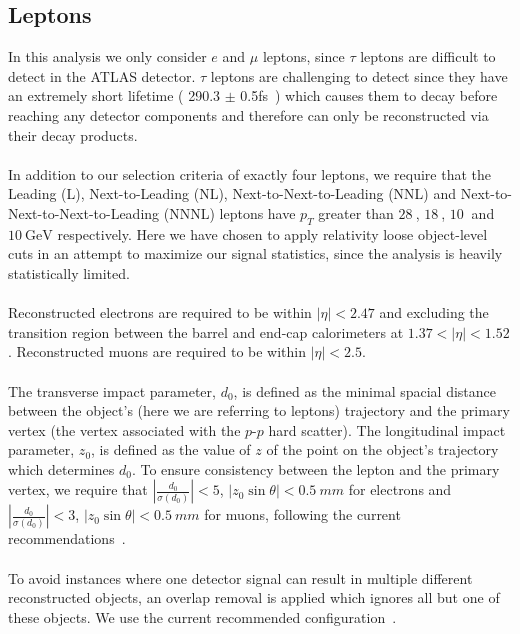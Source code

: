 \subsection{Leptons}
\label{sec:lepton-object}
In this analysis we only consider $e$ and $\mu$ leptons, since $\tau$ leptons are difficult to detect in the ATLAS detector. $\tau$ leptons are challenging to detect since they have an extremely short lifetime ( 290.3 $\pm$ 0.5fs~\cite{pdg}) which causes them to decay before reaching any detector components and therefore can only be reconstructed via their decay products.\\\\

In addition to our selection criteria of exactly four leptons, we require that the Leading (L), Next-to-Leading (NL), Next-to-Next-to-Leading (NNL) and Next-to-Next-to-Next-to-Leading (NNNL) leptons have $p_{T}$ greater than $\SI{28}{}$, $\SI{18}{}$, $\SI{10}{}$ and $\SI{10}{\GeV}$ respectively. Here we have chosen to apply relativity loose object-level cuts in an attempt to maximize our signal statistics, since the analysis is heavily statistically limited.\\\\

Reconstructed electrons are required to be within $|\eta| < 2.47$ and excluding the transition region between the barrel and end-cap calorimeters at $1.37 < |\eta| < 1.52$. Reconstructed muons are required to be within $|\eta| < 2.5$.\\\\

The transverse impact parameter, $d_{0}$, is defined as the minimal spacial distance between the object's (here we are referring to leptons) trajectory and the primary vertex (the vertex associated with the $p$-$p$ hard scatter). The longitudinal impact parameter, $z_{0}$, is defined as the value of $z$ of the point on the object's trajectory which determines $d_{0}$. To ensure consistency between the lepton and the primary vertex, we require that $|\frac{d_{0}}{\sigma(d_{0})}| < 5$, $|z_{0}\sin{\theta}| < \SI{0.5}{mm}$ for electrons and $|\frac{d_{0}}{\sigma(d_{0})}| < 3$, $|z_{0}\sin{\theta}| < \SI{0.5}{mm}$ for muons, following the current recommendations~\cite{TopRecoObjTwikiModel}.\\\\

To avoid instances where one detector signal can result in multiple different reconstructed objects, an overlap removal is applied which ignores all but one of these objects. We use the current recommended configuration~\cite{Overlap-removal-slides}.\\\\

